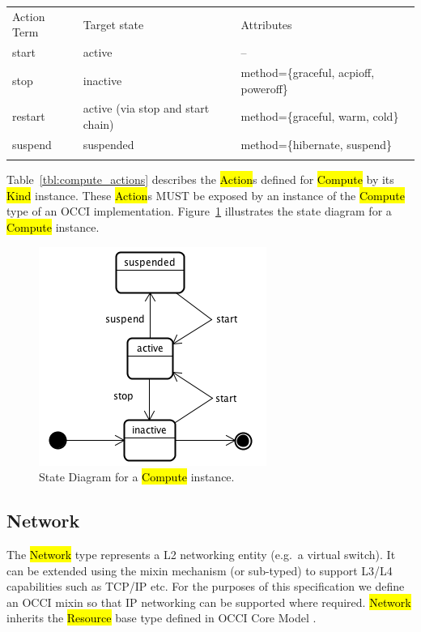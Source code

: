 \documentclass[10pt,a4paper]{article}
\begin{document}
{
	\begin{tabular}{lll}
	\toprule
	Action Term & Target state & Attributes \\
	\colrule
	start & active & -- \\
	stop & inactive & method=\{graceful, acpioff, poweroff\} \\
	restart & active (via stop and start chain) & method=\{graceful, warm, cold\} \\
	suspend & suspended & method=\{hibernate, suspend\} \\
	\botrule
	\end{tabular}
}

Table~\ref{tbl:compute_actions} describes the \hl{Action}s defined for
\hl{Compute} by its \hl{Kind} instance. These \hl{Action}s MUST be exposed 
by an instance of the \hl{Compute} type of an OCCI implementation. 
Figure~\ref{fig:compute_state} illustrates the state diagram for a \hl{Compute} instance.

\begin{figure}[!h]
	\centering
	\includegraphics[scale=0.4]{figs/compute-state.png}
	\caption{State Diagram for a \hl{Compute} instance.}
	\label{fig:compute_state}
\end{figure}

\subsection{Network}
The \hl{Network} type represents a L2 networking entity (e.g.~a virtual switch).
%
It can be extended using 
the mixin mechanism (or sub-typed) to support L3/L4 capabilities such as TCP/IP etc. 
For the purposes of this specification we define an OCCI mixin so that IP networking can be supported
where required. 
%
\hl{Network} inherits the \hl{Resource} base type defined in OCCI Core Model \cite{occi:core}.
\end{document}
